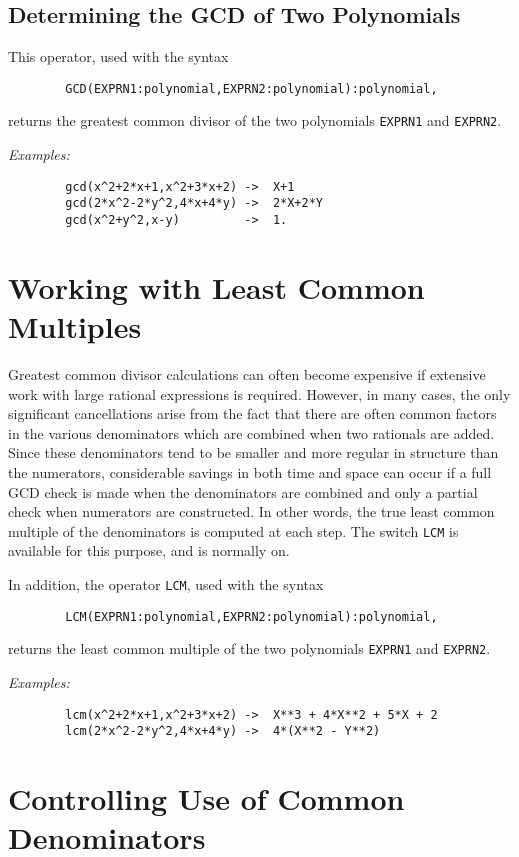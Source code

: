 \subsection{Determining the GCD of Two Polynomials}
This operator, used with the syntax
\begin{verbatim}
        GCD(EXPRN1:polynomial,EXPRN2:polynomial):polynomial,
\end{verbatim}
returns the greatest common divisor of the two polynomials {\tt EXPRN1} and
{\tt EXPRN2}.

{\it Examples:}
\begin{verbatim}
        gcd(x^2+2*x+1,x^2+3*x+2) ->  X+1
        gcd(2*x^2-2*y^2,4*x+4*y) ->  2*X+2*Y
        gcd(x^2+y^2,x-y)         ->  1.
\end{verbatim}

\section{Working with Least Common Multiples}

Greatest common divisor calculations can often become expensive if
extensive work with large rational expressions is required. However, in
many cases, the only significant cancellations arise from the fact that
there are often common factors in the various denominators which are
combined when two rationals are added. Since these denominators tend to be
smaller and more regular in structure than the numerators, considerable
savings in both time and space can occur if a full GCD check is made when
the denominators are combined and only a partial check when numerators are
constructed. In other words, the true least common multiple of the
denominators is computed at each step. The switch {\tt LCM} 
is available for this purpose, and is normally on.

In addition, the operator {\tt LCM},  used with the syntax
\begin{verbatim}
        LCM(EXPRN1:polynomial,EXPRN2:polynomial):polynomial,
\end{verbatim}
returns the least common multiple of the two polynomials {\tt EXPRN1} and
{\tt EXPRN2}.

{\it Examples:}
\begin{verbatim}
        lcm(x^2+2*x+1,x^2+3*x+2) ->  X**3 + 4*X**2 + 5*X + 2
        lcm(2*x^2-2*y^2,4*x+4*y) ->  4*(X**2 - Y**2)
\end{verbatim}

\section{Controlling Use of Common Denominators}

